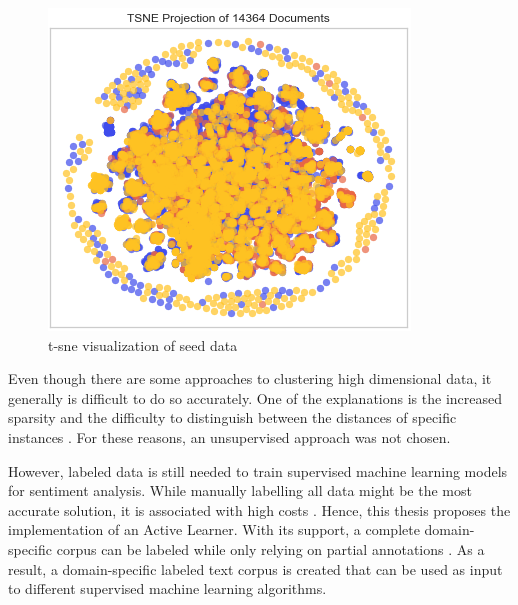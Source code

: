 \documentclass[11pt, a4paper]{article}
\begin{document}
\begin{figure}
    \centering
    \includegraphics[width=\textwidth]{tsne_projection.png}
    \caption{t-sne visualization of seed data}
    \label{fig:t-sne}
\end{figure}

Even though there are some approaches to clustering high dimensional data, it generally is difficult to do so accurately. 
One of the explanations is the increased sparsity and the difficulty to distinguish between the distances 
of specific instances \citep{tomasev2014roleofhubness}. For these reasons, an unsupervised approach was not chosen.

However, labeled data is still needed to train supervised machine learning models for sentiment analysis. While manually labelling
all data might be the most accurate solution, it is associated with high costs \citep{miller2020activelearningapproaches}.
Hence, this thesis proposes the implementation of an Active Learner. With its support, a complete domain-specific corpus can be labeled while only relying on partial annotations \citep{park2015EfficientExtraction}.
As a result, a domain-specific labeled text corpus is created that can be used as input to different supervised machine learning algorithms.
\end{document}
